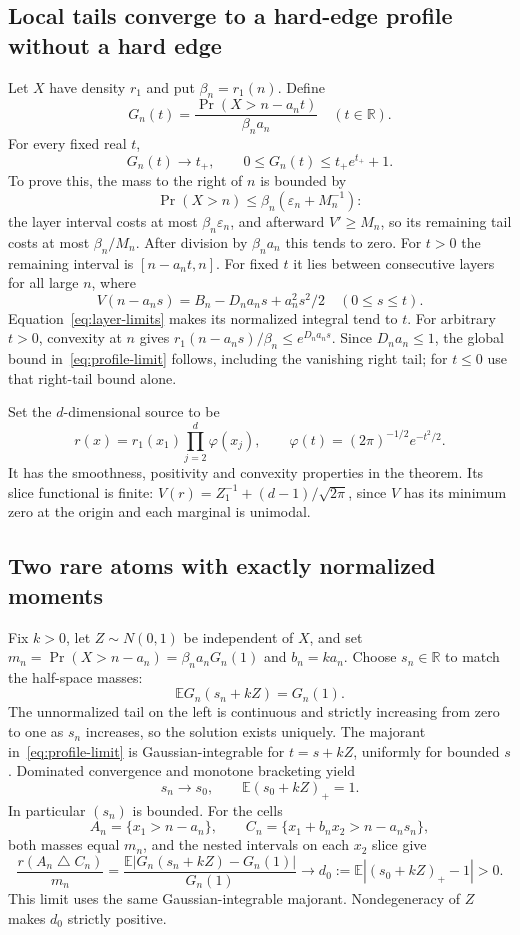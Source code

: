 \documentclass[11pt]{article}
\theoremstyle{remark}\newtheorem{remark}[theorem]{Remark}
\newcommand{\R}{\mathbb R}\newcommand{\Var}{\operatorname{Var}}
\newcommand{\E}{\mathbb E}
\begin{document}
\subsection*{Local tails converge to a hard-edge profile without a hard edge}
Let $X$ have density $r_1$ and put $\beta_n=r_1(n)$. Define
\[
 G_n(t)=\frac{\Pr(X>n-a_nt)}{\beta_na_n}\quad(t\in\R).
\]
For every fixed real $t$,
\begin{equation}\label{eq:profile-limit}
 G_n(t)\longrightarrow t_+,
 \qquad
 0\le G_n(t)\le t_+e^{t_+}+1.
\end{equation}
To prove this, the mass to the right of $n$ is bounded by
\[
 \Pr(X>n)\le\beta_n(\varepsilon_n+M_n^{-1}):
\]
the layer interval costs at most $\beta_n\varepsilon_n$, and afterward $V'\ge M_n$, so its remaining tail costs at most $\beta_n/M_n$. After division by $\beta_na_n$ this tends to zero. For $t>0$ the remaining interval is $[n-a_nt,n]$. For fixed $t$ it lies between consecutive layers for all large $n$, where
\[
 V(n-a_ns)=B_n-D_na_ns+a_n^2s^2/2\quad(0\le s\le t).
\]
Equation~\eqref{eq:layer-limits} makes its normalized integral tend to $t$. For arbitrary $t>0$, convexity at $n$ gives
$r_1(n-a_ns)/\beta_n\le e^{D_na_ns}$. Since $D_na_n\le1$, the global bound in~\eqref{eq:profile-limit} follows, including the vanishing right tail; for $t\le0$ use that right-tail bound alone.

Set the $d$-dimensional source to be
\[
 r(x)=r_1(x_1)\prod_{j=2}^d\varphi(x_j),
 \qquad \varphi(t)=(2\pi)^{-1/2}e^{-t^2/2}.
\]
It has the smoothness, positivity and convexity properties in the theorem. Its slice functional is finite: $V(r)=Z_1^{-1}+(d-1)/\sqrt{2\pi}$, since $V$ has its minimum zero at the origin and each marginal is unimodal.

\subsection*{Two rare atoms with exactly normalized moments}
Fix $k>0$, let $Z\sim N(0,1)$ be independent of $X$, and set
$m_n=\Pr(X>n-a_n)=\beta_na_nG_n(1)$ and $b_n=ka_n$.
Choose $s_n\in\R$ to match the half-space masses:
\begin{equation}\label{eq:layer-mass-match}
 \E G_n(s_n+kZ)=G_n(1).
\end{equation}
The unnormalized tail on the left is continuous and strictly increasing from zero to one as $s_n$ increases, so the solution exists uniquely. The majorant in~\eqref{eq:profile-limit} is Gaussian-integrable for $t=s+kZ$, uniformly for bounded $s$. Dominated convergence and monotone bracketing yield
\[
 s_n\to s_0,\qquad \E(s_0+kZ)_+=1.
\]
In particular $(s_n)$ is bounded. For the cells
\[
 A_n=\{x_1>n-a_n\},\qquad
 C_n=\{x_1+b_nx_2>n-a_ns_n\},
\]
both masses equal $m_n$, and the nested intervals on each $x_2$ slice give
\begin{equation}\label{eq:layer-symdiff}
 \frac{r(A_n\mathbin\triangle C_n)}{m_n}
 =\frac{\E|G_n(s_n+kZ)-G_n(1)|}{G_n(1)}
 \longrightarrow d_0:=\E|(s_0+kZ)_+-1|>0.
\end{equation}
This limit uses the same Gaussian-integrable majorant. Nondegeneracy of $Z$ makes $d_0$ strictly positive.
\end{document}
